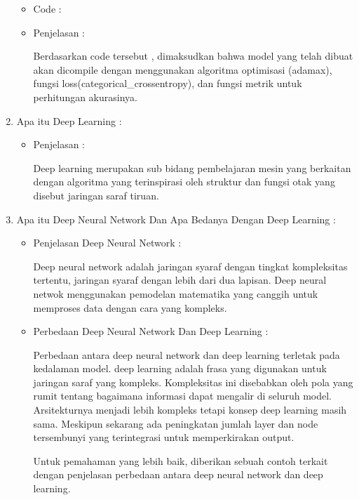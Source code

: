 \begin{enumerate}
\begin{itemize}
\item Code :

\item Penjelasan : 
\par Berdasarkan code tersebut , dimaksudkan bahwa model yang telah dibuat akan dicompile dengan menggunakan algoritma optimisasi (adamax), fungsi loss(categorical\_crossentropy), dan fungsi metrik untuk perhitungan akurasinya.
\par
\par
\end{itemize}
\par
\par
\par
\item Apa itu Deep Learning :
\begin{itemize}
\item Penjelasan :
\par Deep learning merupakan sub bidang pembelajaran mesin yang berkaitan dengan algoritma yang terinspirasi oleh struktur dan fungsi otak yang disebut jaringan saraf tiruan.
\par
\par
\par
\end{itemize}
\item Apa itu Deep Neural Network Dan Apa Bedanya Dengan Deep Learning :
\begin{itemize}
\item Penjelasan Deep Neural Network : 
\par Deep neural network adalah jaringan syaraf dengan tingkat kompleksitas tertentu, jaringan syaraf dengan lebih dari dua lapisan. Deep neural netwok menggunakan pemodelan matematika yang canggih untuk memproses data dengan cara yang kompleks.
\par
\item Perbedaan Deep Neural Network Dan Deep Learning :
\par Perbedaan antara deep neural network dan deep learning terletak pada kedalaman model. deep learning adalah frasa yang digunakan untuk jaringan saraf yang kompleks. Kompleksitas ini disebabkan oleh pola yang rumit tentang bagaimana informasi dapat mengalir di seluruh model. Arsitekturnya menjadi lebih kompleks tetapi konsep deep learning masih sama. Meskipun sekarang ada peningkatan jumlah layer dan node tersembunyi yang terintegrasi untuk memperkirakan output.
\par Untuk pemahaman yang lebih baik, diberikan sebuah contoh terkait dengan penjelasan perbedaan antara deep neural network dan deep learning.

\end{itemize}
\end{enumerate}
